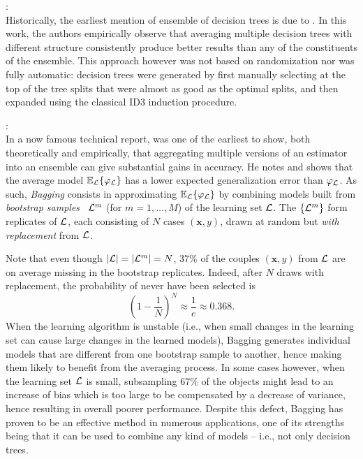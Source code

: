 \begin{description}

\item \citet{kwok:1990}: \hfill \\
    Historically, the earliest mention of ensemble of decision trees is due to
    \citet{kwok:1990}. In this work, the authors empirically observe that
    averaging multiple decision trees with different structure consistently
    produce better results than any of the constituents of the ensemble. This
    approach however was not based on randomization nor was fully automatic:
    decision trees were generated by first manually selecting at the top of the
    tree splits that were almost as good as the optimal splits, and then
    expanded using the classical ID3 induction procedure.

\item \citet{breiman:1996b}: \hfill \\
    In a now famous technical report, \citet{breiman:1996b} was one of the earliest to
    show, both theoretically and empirically, that aggregating multiple
    versions of an estimator into an ensemble can give substantial gains in
    accuracy. He notes and shows that the average model $\mathbb{E}_{\cal L}\{
    \varphi_{\cal L} \}$ has a lower expected generalization error than
    $\varphi_{\cal L}$. As such, \textit{Bagging}  consists in
    approximating $\mathbb{E}_{\cal L}\{ \varphi_{\cal L} \}$  by combining
    models built from \textit{bootstrap samples}~\citep{efron:1979} ${\cal
    L}^m$\label{ntn:L_m} (for $m=1,\dots,M$) of the learning set ${\cal L}$. The $\{ {\cal
    L}^m \}$ form replicates of ${\cal L}$, each consisting of $N$ cases $(\mathbf{x},y)$, drawn
    at random but \textit{with replacement} from ${\cal L}$.

    Note that even
    though $|{\cal L}|=|{\cal L}^m|=N$, $37\%$ of the couples $(\mathbf{x},y)$ from ${\cal L}$
    are on average missing in the bootstrap replicates. Indeed, after $N$ draws
    with replacement, the probability of never have been selected is
    \begin{equation}
    (1 - \frac{1}{N})^N \approx \frac{1}{e} \approx 0.368.
    \end{equation}
    When the learning algorithm is unstable (i.e., when small changes in the
    learning set can cause large changes in the learned models), Bagging
    generates individual models that are  different from one bootstrap sample
    to another, hence making them likely to benefit from the averaging process.
    In some cases however, when the learning set ${\cal L}$ is small,
    subsampling $67\%$ of the objects might lead to an increase of bias which
    is too large to be compensated by a decrease of variance, hence resulting
    in overall poorer performance. Despite this defect, Bagging has proven to
    be an effective method in numerous applications, one of its strengths being
    that it can be used to combine any kind of models -- i.e., not only
    decision trees.


\end{description}
